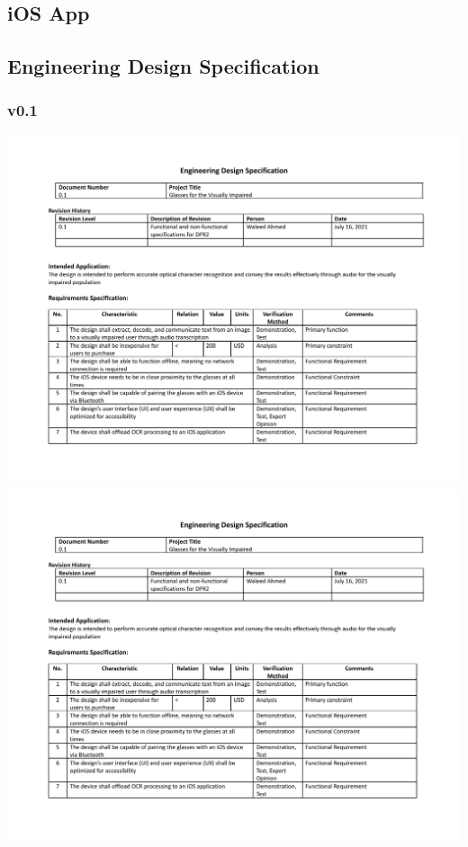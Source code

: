 \documentclass[a4paper,11pt]{article}
\begin{document}
\subsection{iOS App}

\newpage
\begin{landscape}
    \subsection{Engineering Design Specification}
    \subsubsection{v0.1}
    \begin{center}
        \includegraphics[page=1,width={0.86\linewidth}]{pdf/eds_0.1.pdf}
        \newpage
        \includegraphics[page=2,width={0.86\linewidth}]{pdf/eds_0.1.pdf}
    \end{center}
    

\end{landscape}
\end{document}
